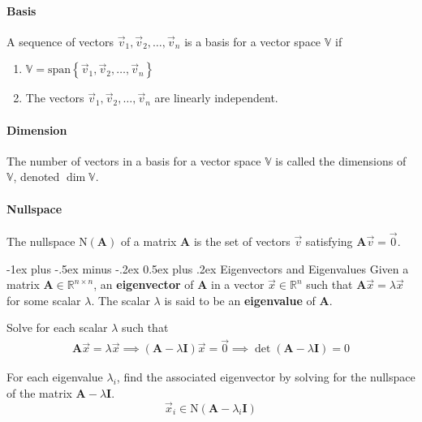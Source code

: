 \documentclass[10pt,landscape,letterpaper]{article}
\makeatletter
\renewcommand{\section}{\@startsection{section}{1}{0mm}%
                                {-1ex plus -.5ex minus -.2ex}%
                                {0.5ex plus .2ex}%
                                {\normalfont\large\bfseries}}
\newcommand{\matr}[1]{\mathbf{#1}}
\newcommand{\vecspace}[1]{\mathbb{#1}}
\newcommand\cheatsheetmargin{0.2cm}
\makeatother
\begin{document}
\begin{multicols}{3}
\paragraph{Basis}
A sequence of vectors $\vec{v}_1, \vec{v}_2, \ldots, \vec{v}_n$ is a basis for a vector space $\vecspace{V}$ if
\begin{enumerate}[noitemsep]
    \item $\vecspace{V}= \mathrm{span}\left\{\vec{v}_1, \vec{v}_2, \ldots, \vec{v}_n\right\}$
    \item The vectors $\vec{v}_1, \vec{v}_2, \ldots, \vec{v}_n$ are linearly independent.
\end{enumerate}

\paragraph{Dimension} The number of vectors in a basis for a vector space $\vecspace{V}$ is called the dimensions of $\vecspace{V}$, denoted $\dim \vecspace{V}$.

\paragraph{Nullspace}
The nullspace $\mathrm{N}(\matr{A})$ of a matrix $\matr{A}$ is the set of vectors $\vec{v}$ satisfying $\matr{A}\vec{v} = \vec{0}$.

\section{Eigenvectors and Eigenvalues}
Given a matrix $\matr{A}\in\vecspace{R}^{n\times n}$, an \textbf{eigenvector} of $\matr{A}$ in a vector $\vec{x}\in\vecspace{R}^n$ such that $\matr{A}\vec{x} = \lambda\vec{x}$ for some scalar $\lambda$. The scalar $\lambda$ is said to be an \textbf{eigenvalue} of $\matr{A}$.
\begin{description}[style=unboxed,leftmargin=\cheatsheetmargin+0.2cm, topsep=0.2cm]
    \item[Computing Eigenvalues]
        Solve for each scalar $\lambda$ such that
        \begin{gather*}
            \matr{A}\vec{x} = \lambda\vec{x} \implies \left(\matr{A} - \lambda \matr{I}\right)\vec{x} = \vec{0} \implies \boxed{\det \left( \matr{A} - \lambda \matr{I}\right) = 0}
        \end{gather*}
        
        For each eigenvalue $\lambda_i$, find the associated eigenvector by solving for the nullspace of the matrix $\matr{A} - \lambda \matr{I}$.
        \begin{equation*}
            \vec{x}_i \in \mathrm{N}(\matr{A} - \lambda_i \matr{I})
        \end{equation*}
    

\end{description}
\end{multicols}
\end{document}
